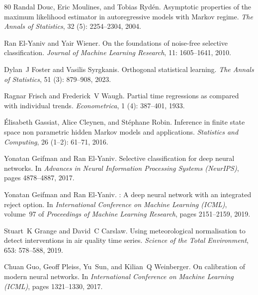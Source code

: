 \begin{thebibliography}{80}
Randal Douc, Eric Moulines, and Tobias Ryd{\'e}n.
\newblock Asymptotic properties of the maximum likelihood estimator in autoregressive models with {M}arkov regime.
\newblock \emph{The Annals of Statistics}, 32 (5): 2254--2304, 2004.

Ran El-Yaniv and Yair Wiener.
\newblock On the foundations of noise-free selective classification.
\newblock \emph{Journal of Machine Learning Research}, 11: 1605--1641, 2010.

Dylan~J Foster and Vasilis Syrgkanis.
\newblock Orthogonal statistical learning.
\newblock \emph{The Annals of Statistics}, 51 (3): 879--908, 2023.

Ragnar Frisch and Frederick~V Waugh.
\newblock Partial time regressions as compared with individual trends.
\newblock \emph{Econometrica}, 1 (4): 387--401, 1933.

{\'E}lisabeth Gassiat, Alice Cleynen, and St{\'e}phane Robin.
\newblock Inference in finite state space non parametric hidden {M}arkov models and applications.
\newblock \emph{Statistics and Computing}, 26 (1--2): 61--71, 2016.

Yonatan Geifman and Ran El-Yaniv.
\newblock Selective classification for deep neural networks.
\newblock In \emph{Advances in Neural Information Processing Systems (NeurIPS)}, pages 4878--4887, 2017.

Yonatan Geifman and Ran El-Yaniv.
: A deep neural network with an integrated reject option.
\newblock In \emph{International Conference on Machine Learning (ICML)}, volume~97 of \emph{Proceedings of Machine Learning Research}, pages 2151--2159, 2019.

Stuart~K Grange and David~C Carslaw.
\newblock Using meteorological normalisation to detect interventions in air quality time series.
\newblock \emph{Science of the Total Environment}, 653: 578--588, 2019.

Chuan Guo, Geoff Pleiss, Yu~Sun, and Kilian~Q Weinberger.
\newblock On calibration of modern neural networks.
\newblock In \emph{International Conference on Machine Learning (ICML)}, pages 1321--1330, 2017.


\end{thebibliography}
